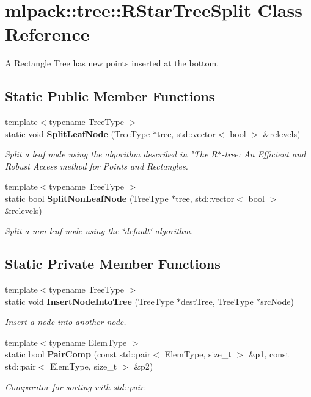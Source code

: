 \section{mlpack\+:\+:tree\+:\+:R\+Star\+Tree\+Split Class Reference}
\label{classmlpack_1_1tree_1_1RStarTreeSplit}


A Rectangle Tree has new points inserted at the bottom.  


\subsection*{Static Public Member Functions}
\begin{DoxyCompactItemize}
\item 
{\footnotesize template$<$typename Tree\+Type $>$ }\\static void {\bf Split\+Leaf\+Node} (Tree\+Type $\ast$tree, std\+::vector$<$ bool $>$ \&relevels)
\begin{DoxyCompactList}\small\item\em Split a leaf node using the algorithm described in "The R$\ast$-\/tree\+: An Efficient and Robust Access method for Points and Rectangles. \end{DoxyCompactList}\item 
{\footnotesize template$<$typename Tree\+Type $>$ }\\static bool {\bf Split\+Non\+Leaf\+Node} (Tree\+Type $\ast$tree, std\+::vector$<$ bool $>$ \&relevels)
\begin{DoxyCompactList}\small\item\em Split a non-\/leaf node using the \char`\"{}default\char`\"{} algorithm. \end{DoxyCompactList}\end{DoxyCompactItemize}
\subsection*{Static Private Member Functions}
\begin{DoxyCompactItemize}
\item 
{\footnotesize template$<$typename Tree\+Type $>$ }\\static void {\bf Insert\+Node\+Into\+Tree} (Tree\+Type $\ast$dest\+Tree, Tree\+Type $\ast$src\+Node)
\begin{DoxyCompactList}\small\item\em Insert a node into another node. \end{DoxyCompactList}\item 
{\footnotesize template$<$typename Elem\+Type $>$ }\\static bool {\bf Pair\+Comp} (const std\+::pair$<$ Elem\+Type, size\+\_\+t $>$ \&p1, const std\+::pair$<$ Elem\+Type, size\+\_\+t $>$ \&p2)
\begin{DoxyCompactList}\small\item\em Comparator for sorting with std\+::pair. \end{DoxyCompactList}\end{DoxyCompactItemize}


